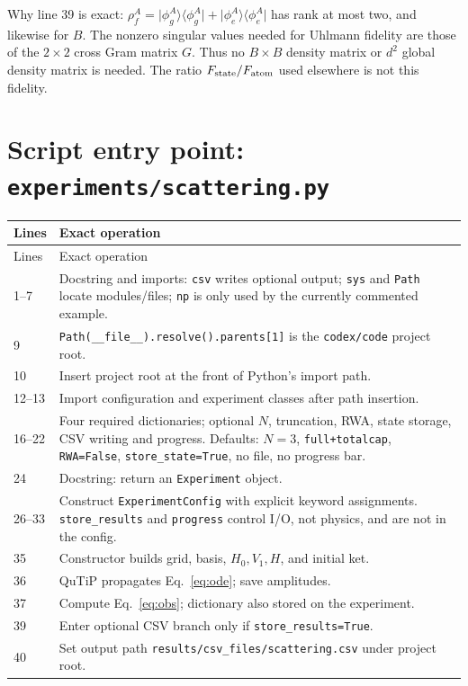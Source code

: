\documentclass[11pt,a4paper]{article}
\newcommand{\ket}[1]{\lvert #1\rangle}
\newcommand{\bra}[1]{\langle #1\rvert}
\newcommand{\code}[1]{\nolinkurl{#1}}
\begin{document}
Why line 39 is exact: $\rho_f^A=
\ket{\phi_g^A}\bra{\phi_g^A}+\ket{\phi_e^A}\bra{\phi_e^A}$
has rank at most two, and likewise for $B$. The nonzero singular values needed
for Uhlmann fidelity are those of the $2\times2$ cross Gram matrix $G$.
Thus no $B\times B$ density matrix or $d^2$ global density matrix is needed.
The ratio $F_{\rm state}/F_{\rm atom}$ used elsewhere is not this fidelity.

\section{Script entry point: \code{experiments/scattering.py}}

\begin{longtable}{p{}p{}}
\toprule Lines & Exact operation\\\midrule\endfirsthead
\toprule Lines & Exact operation\\\midrule\endhead
1--7 & Docstring and imports: \code{csv} writes optional output; \code{sys} and \code{Path} locate modules/files; \code{np} is only used by the currently commented example.\\
9 & \code{Path(__file__).resolve().parents[1]} is the \code{codex/code} project root.\\
10 & Insert project root at the front of Python's import path.\\
12--13 & Import configuration and experiment classes after path insertion.\\
16--22 & Four required dictionaries; optional $N$, truncation, RWA, state storage, CSV writing and progress. Defaults: $N=3$, \code{full+totalcap}, \code{RWA=False}, \code{store_state=True}, no file, no progress bar.\\
24 & Docstring: return an \code{Experiment} object.\\
26--33 & Construct \code{ExperimentConfig} with explicit keyword assignments. \code{store_results} and \code{progress} control I/O, not physics, and are not in the config.\\
35 & Constructor builds grid, basis, $H_0,V_1,H$, and initial ket.\\
36 & QuTiP propagates Eq.~\eqref{eq:ode}; save amplitudes.\\
37 & Compute Eq.~\eqref{eq:obs}; dictionary also stored on the experiment.\\
39 & Enter optional CSV branch only if \code{store_results=True}.\\
40 & Set output path \code{results/csv_files/scattering.csv} under project root.\\

\end{longtable}
\end{document}
